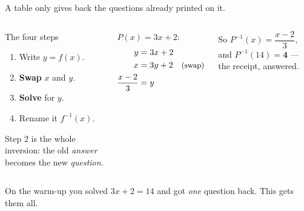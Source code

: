 \documentclass[aspectratio=169, 11pt]{beamer}
\begin{document}
\begin{frame}[t, plain]

  A table only gives back the questions already printed on it.

  \medskip
  \begin{columns}[T, onlytextwidth]
      \begin{block}{The four steps}
        \begin{enumerate}\setlength{\itemsep}{2pt}
          \item Write \(y = f(x)\).
          \item \textbf{Swap} \(x\) and \(y\).
          \item \textbf{Solve} for \(y\).
          \item Rename it \(f^{-1}(x)\).
        \end{enumerate}

        \smallskip
        Step 2 is the whole inversion: the old \textit{answer} becomes the new
        \textit{question}.
      \end{block}

      \(P(x) = 3x + 2\):
      \begin{align*}
        y &= 3x + 2 \\
        x &= 3y + 2 \quad \text{\small(swap)} \\
        \frac{x-2}{3} &= y
      \end{align*}

      \smallskip
      So \(P^{-1}(x) = \dfrac{x-2}{3}\), and \(P^{-1}(14) = \mathbf{4}\) ---
      the receipt, answered.
  \end{columns}

  \medskip
  \begin{center}
    On the warm-up you solved \(3x + 2 = 14\) and got \textit{one} question
    back. This gets them all.
  \end{center}
\end{frame}
\end{document}
